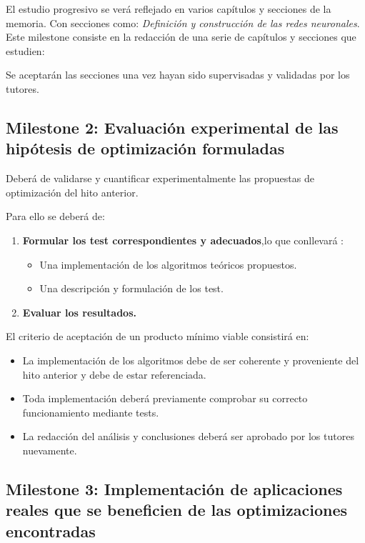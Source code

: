 El estudio progresivo se verá reflejado en varios capítulos y secciones de la memoria. Con secciones como: 
\textit{Definición  y construcción de las redes neuronales}. 
Este milestone consiste en la redacción de una serie de capítulos y secciones 
que estudien: 

Se aceptarán las secciones una vez hayan sido supervisadas y validadas por los tutores. 

\subsection*{Milestone 2: Evaluación experimental de las hipótesis de optimización formuladas}

Deberá de validarse y cuantificar experimentalmente las propuestas de optimización del hito anterior. 

Para ello  se deberá de: 
\begin{enumerate}
    \item \textbf{Formular los test correspondientes y adecuados},lo que conllevará : 
    \begin{itemize}
        \item Una implementación de los algoritmos teóricos propuestos.
        \item Una descripción y formulación de los test.
    \end{itemize}

    \item \textbf{Evaluar los resultados.}
\end{enumerate}

El criterio de aceptación de un producto mínimo viable consistirá en:
\begin{itemize}
    \item La implementación de los algoritmos debe de ser coherente y proveniente del hito anterior y debe de estar referenciada.
    \item  Toda implementación deberá previamente comprobar su correcto funcionamiento mediante tests.
    \item La redacción del análisis y conclusiones deberá ser aprobado por los tutores nuevamente.
\end{itemize}

\subsection*{Milestone 3: Implementación de aplicaciones reales que se beneficien de las optimizaciones encontradas }

